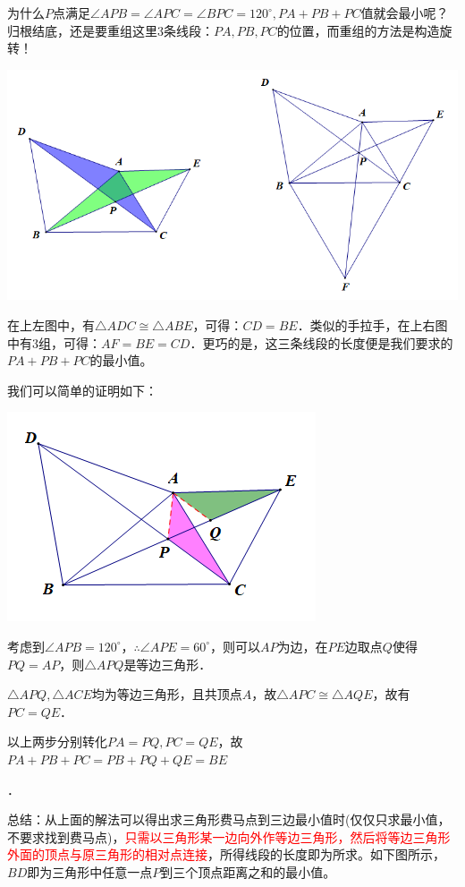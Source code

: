 \documentclass[10pt]{ctexart}
\begin{document}
为什么$P$点满足$\angle APB=\angle APC=\angle BPC=120^\circ,PA+PB+PC$值就会最小呢？归根结底，还是要重组这里3条线段：$PA,PB,PC$的位置，而重组的方法是构造旋转！

\begin{center}
	\includegraphics[scale=0.5]{figure/feimadian06}
\end{center}

在上左图中，有$\triangle ADC \cong \triangle ABE$，可得：$CD=BE$．类似的手拉手，在上右图中有3组，可得：$AF=BE=CD$．更巧的是，这三条线段的长度便是我们要求的$PA+PB+PC$的最小值。

我们可以简单的证明如下：

\begin{center}
	\includegraphics[scale=0.7]{figure/feimadian07}
\end{center}

{\kaishu\color{blue}考虑到$\angle APB=120^\circ$，$\therefore \angle APE=60^\circ$，则可以$AP$为边，在$PE$边取点$Q$使得$PQ=AP$，则$\triangle APQ$是等边三角形．

$\triangle APQ,\triangle ACE$均为等边三角形，且共顶点$A$，故$\triangle APC\cong \triangle AQE$，故有$PC=QE$．

以上两步分别转化$PA=PQ,PC=QE$，故$PA+PB+PC=PB+PQ+QE=BE$}．

总结：从上面的解法可以得出求三角形费马点到三边最小值时({\kaishu 仅仅只求最小值，不要求找到费马点})，\textcolor{red}{只需以三角形某一边向外作等边三角形，然后将等边三角形外面的顶点与原三角形的相对点连接}，所得线段的长度即为所求。如下图所示，$BD$即为三角形中任意一点$P$到三个顶点距离之和的最小值。
\end{document}
